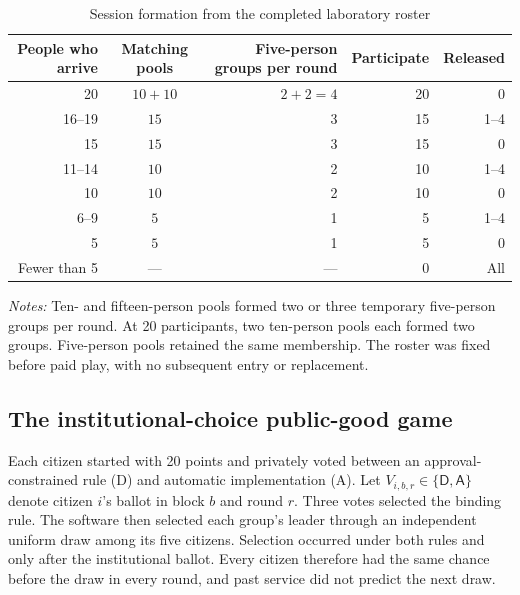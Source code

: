 \documentclass[11pt]{article}
\newcommand{\Dproc}{\textsf{D}}
\newcommand{\Aproc}{\textsf{A}}
\begin{document}
\begin{table}[H]
\centering
\small
\caption{Session formation from the completed laboratory roster}
\label{tab:attendance-pools}
\begin{tabular}{rcrrr}
\toprule
People who arrive & Matching pools & Five-person groups per round & Participate & Released \\
\midrule
20 & $10+10$ & $2+2=4$ & 20 & 0 \\
16--19 & $15$ & 3 & 15 & 1--4 \\
15 & $15$ & 3 & 15 & 0 \\
11--14 & $10$ & 2 & 10 & 1--4 \\
10 & $10$ & 2 & 10 & 0 \\
6--9 & $5$ & 1 & 5 & 1--4 \\
5 & $5$ & 1 & 5 & 0 \\
Fewer than 5 & --- & --- & 0 & All \\
\bottomrule
\end{tabular}
\begin{minipage}{0.96\textwidth}
\footnotesize\textit{Notes:} Ten- and fifteen-person pools formed two or three temporary five-person groups per round. At 20 participants, two ten-person pools each formed two groups. Five-person pools retained the same membership. The roster was fixed before paid play, with no subsequent entry or replacement.
\end{minipage}
\end{table}

\subsection{The institutional-choice public-good game}

Each citizen started with 20 points and privately voted between an approval-constrained rule (\Dproc) and automatic implementation (\Aproc). Let \(V_{i,b,r}\in\{\Dproc,\Aproc\}\) denote citizen \(i\)'s ballot in block \(b\) and round \(r\). Three votes selected the binding rule. The software then selected each group's leader through an independent uniform draw among its five citizens. Selection occurred under both rules and only after the institutional ballot. Every citizen therefore had the same chance before the draw in every round, and past service did not predict the next draw.
\end{document}
